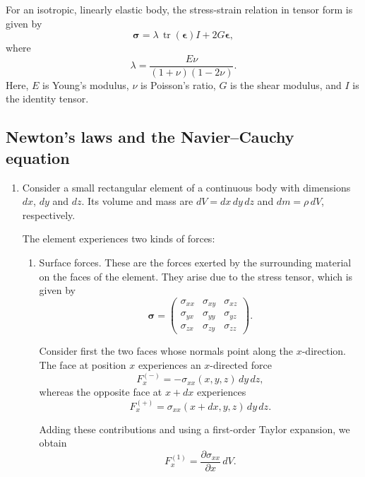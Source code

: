 \documentclass[10pt,a4paper]{article}
\begin{document}
\begin{theorem}
For an \textcolor{red!70!black}{\textnormal{\textsf{isotropic, linearly elastic body}}}, the stress-strain
relation in tensor form is given by
\[
\boldsymbol{\sigma}
=
\lambda\,\operatorname{tr}(\boldsymbol{\epsilon})I
+2G\boldsymbol{\epsilon},
\]
where
\[
\lambda=\frac{E\nu}{(1+\nu)(1-2\nu)}.
\]
Here, \(E\) is Young's modulus, \(\nu\) is Poisson's ratio,
\(G\) is the shear modulus, and \(I\) is the identity tensor.
\end{theorem}

\subsection{Newton's laws and the Navier--Cauchy equation}
\begin{enumerate}

    \item Consider a small rectangular element of a continuous body
    with dimensions \(dx\), \(dy\) and \(dz\). Its volume and mass
    are \(dV = dx\,dy\,dz\) and \(dm = \rho\,dV\), respectively.

    The element experiences two kinds of forces:

    \begin{enumerate}

        \item \textsf{\textcolor{red!70!black}{Surface forces.}}
        These are the forces exerted by the surrounding material
        on the faces of the element. They arise due to the
        stress tensor, which is given by
        \[
        \boldsymbol{\sigma} =
        \begin{pmatrix}
        \sigma_{xx} & \sigma_{xy} & \sigma_{xz}\\
        \sigma_{yx} & \sigma_{yy} & \sigma_{yz}\\
        \sigma_{zx} & \sigma_{zy} & \sigma_{zz}
        \end{pmatrix}.
        \]

        Consider first the two faces whose normals point along
        the \(x\)-direction. The face at position \(x\) experiences
        an \(x\)-directed force
        \[
        F_x^{(-)}=-\sigma_{xx}(x,y,z)\,dy\,dz,
        \]
        whereas the opposite face at \(x+dx\) experiences
        \[
        F_x^{(+)}=\sigma_{xx}(x+dx,y,z)\,dy\,dz.
        \]

        Adding these contributions and using a first-order
        Taylor expansion, we obtain
        \[
        F_x^{(1)}
        =\frac{\partial \sigma_{xx}}{\partial x}\,dV.
        \]


\end{enumerate}
\end{enumerate}
\end{document}
